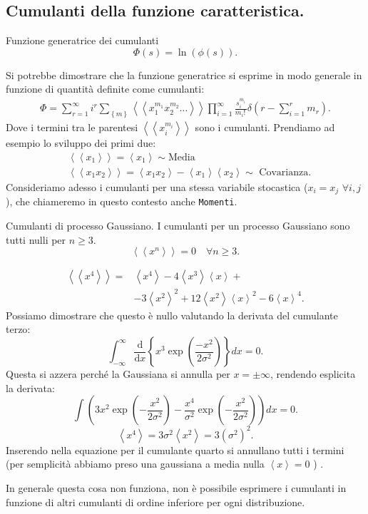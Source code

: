 \subsection{Cumulanti della funzione caratteristica.}%
\label{sub:Sviluppo in cumulanti di phi}
\begin{redbox}{Funzione generatrice dei cumulanti}
   \[
       \Phi(s) = \ln (\phi (s) ) 
   .\]  
\end{redbox}
\noindent
Si potrebbe dimostrare che la funzione generatrice si esprime in modo generale in funzione di quantità definite come cumulanti:
\[\begin{aligned}
    \Phi = \sum_{r=1}^{\infty} i^r \sum_{\left\{m\right\}}^{} 
    \left<\left< x_1^{m_1}x_2^{m_2}\ldots\right>\right> 
    \prod_{i=1}^{\infty} \frac{s_i^{m_i}}{m_i!\,}\delta (r-\sum_{i=1}^{r} m_r) 
.\end{aligned}\]
Dove i termini tra le parentesi $\left<\left< x_i^{m_i}\right>\right>$ sono i cumulanti. Prendiamo ad esempio lo sviluppo dei primi due:
\[\begin{aligned}
    & \left<\left<x_1\right>\right> = \left<x_1\right> \sim \text{Media}\\
    & \left<\left<x_1 x_2 \right>\right> = \left<x_1x_2\right> - \left<x_1\right>\left<x_2\right> \sim \text{ Covarianza}
.\end{aligned}\]
Consideriamo adesso i cumulanti per una stessa variabile stocastica ($x_i = x_j $ $\forall i, j$), che chiameremo in questo contesto anche \texttt{Momenti}.
\begin{greenbox}{Cumulanti di processo Gaussiano.}
   I cumulanti per un processo Gaussiano sono tutti nulli per $n\ge 3$.
   \[
       \left<\left<x^n\right>\right> = 0 \quad \forall n \ge  3
   .\] 
\end{greenbox}
\begin{exmp}
    \[\begin{aligned}
	\left<\left<x^4\right>\right> =& \left<x^4\right>-4\left<x^3\right>\left<x\right>+\\
					&-3\left<x^2\right>^2 + 12\left<x^2\right>\left<x\right>^2-6\left<x\right>^4
    .\end{aligned}\]
    Possiamo dimostrare che questo è nullo valutando la derivata del cumulante terzo:
    \[
        \int_{-\infty}^{\infty} \frac{\text{d} }{\text{d} x} \left\{x^3 \exp\left(\frac{-x^2}{2\sigma^2}\right)\right\} dx = 0 
    .\] 
    Questa si azzera perché la Gaussiana si annulla per $x = \pm \infty$, rendendo esplicita la derivata:
    \[
        \int\left(3x^2\exp\left(-\frac{x^2}{2\sigma^2}\right) - 
		\frac{x^4}{\sigma^2}\exp\left(- \frac{x^2}{2\sigma^2}\right) \right)dx = 0 
    .\] 
    \[
	\left<x^4\right> = 3\sigma^2\left<x^2\right> = 3 \left(\sigma^2\right)^2
    .\] 
    Inserendo nella equazione per il cumulante quarto si annullano tutti i termini (per semplicità abbiamo preso una gaussiana a media nulla $\left<x\right>=0$ ) .
\end{exmp}
\noindent
In generale questa cosa non funziona, non è possibile esprimere i cumulanti in funzione di altri cumulanti di ordine inferiore per ogni distribuzione.

